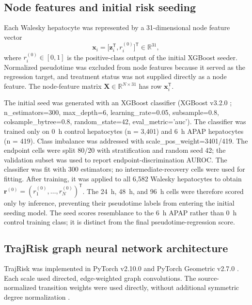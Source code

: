\subsection*{Node features and initial risk seeding}

Each Walesky hepatocyte was represented by a 31-dimensional node feature vector
\begin{equation}\label{eq:node-features}
\boldsymbol x_i=\big[\boldsymbol z_i^{\mathsf T},r_i^{(0)}\big]^{\mathsf T}
\in\mathbb R^{31},
\end{equation}
where \(r_i^{(0)}\in[0,1]\) is the positive-class output of the initial XGBoost seeder. Normalized pseudotime was excluded from node features because it served as the regression target, and treatment status was not supplied directly as a node feature. The node-feature matrix \(\mathbf X\in\mathbb R^{N\times31}\) has row \(\boldsymbol x_i^{\mathsf T}\).

The initial seed was generated with an XGBoost classifier (XGBoost v3.2.0 \cite{ref048}; n\_estimators=300, max\_depth=6, learning\_rate=0.05, subsample=0.8, colsample\_bytree=0.8, random\_state=42, eval\_metric='auc'). The classifier was trained only on 0~h control hepatocytes (n = 3,401) and 6~h APAP hepatocytes (n = 419). Class imbalance was addressed with scale\_pos\_weight=3401/419. The endpoint cells were split 80/20 with stratification and random seed 42; the validation subset was used to report endpoint-discrimination AUROC. The classifier was fit with 300 estimators; no intermediate-recovery cells were used for fitting. After training, it was applied to all 6,582 Walesky hepatocytes to obtain \(\boldsymbol r^{(0)}=(r_1^{(0)},\ldots,r_N^{(0)})^{\mathsf T}\). The 24~h, 48~h, and 96~h cells were therefore scored only by inference, preventing their pseudotime labels from entering the initial seeding model. The seed scores resemblance to the 6~h APAP rather than 0~h control training class; it is distinct from the final pseudotime-regression score.

\subsection*{TrajRisk graph neural network architecture}

TrajRisk was implemented in PyTorch v2.10.0 \cite{ref119} and PyTorch Geometric v2.7.0 \cite{ref118}. Each scale used directed, edge-weighted graph convolutions. The source-normalized transition weights were used directly, without additional symmetric degree normalization \cite{ref044}.

